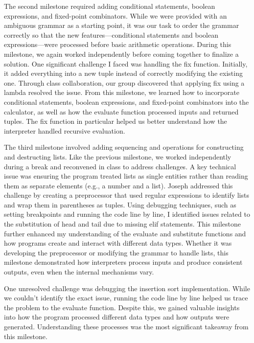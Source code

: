 \documentclass{article}
\theoremstyle{theorem}
\theoremstyle{definition}
\theoremstyle{remark}
\begin{document}
The second milestone required adding conditional statements, boolean expressions, and fixed-point 
combinators. While we were provided with an ambiguous grammar as a starting point, it was our task to 
order the grammar correctly so that the new features—conditional statements and boolean 
expressions—were processed before basic arithmetic operations. During this milestone, we again 
worked independently before coming together to finalize a solution. One significant challenge 
I faced was handling the fix function. Initially, it added everything into a new tuple instead of 
correctly modifying the existing one. Through class collaboration, our group discovered that applying 
fix using a lambda resolved the issue. From this milestone, we learned how to incorporate conditional 
statements, boolean expressions, and fixed-point combinators into the calculator, as well as how the 
evaluate function processed inputs and returned tuples. The fix function in particular helped us better
understand how the interpreter handled recursive evaluation.

The third milestone involved adding sequencing and operations for constructing and destructing lists. 
Like the previous milestone, we worked independently during a break and reconvened in class to address 
challenges. A key technical issue was ensuring the program treated lists as single entities rather 
than reading them as separate elements (e.g., a number and a list). Joseph addressed this challenge 
by creating a preprocessor that used regular expressions to identify lists and wrap them in parentheses 
as tuples. Using debugging techniques, such as setting breakpoints and running the code line by line,
I identified issues related to the substitution of head and tail due to missing elif statements. This 
milestone further enhanced my understanding of the evaluate and substitute functions and how programs 
create and interact with different data types. Whether it was developing the preprocessor or modifying 
the grammar to handle lists, this milestone demonstrated how interpreters process inputs and produce 
consistent outputs, even when the internal mechanisms vary.

One unresolved challenge was debugging the insertion sort implementation. While we couldn't identify 
the exact issue, running the code line by line helped us trace the problem to the evaluate function.
Despite this, we gained valuable insights into how the program processed different data types and 
how outputs were generated. Understanding these processes was the most significant takeaway from this 
milestone.
\end{document}

